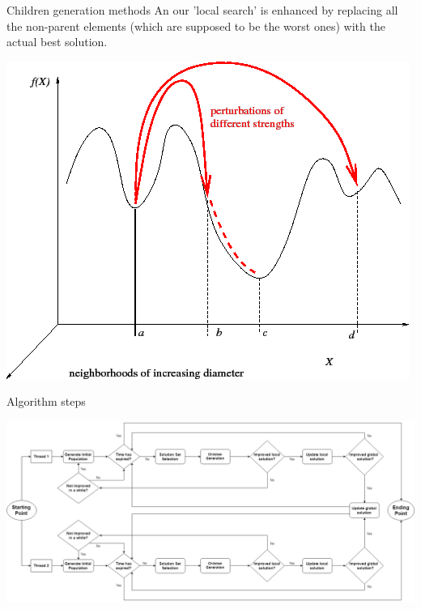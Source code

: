\documentclass[12pt]{beamer}
\begin{document}
  \begin{frame}[fragile]{Children generation methods}
    An our 'local search' is enhanced by replacing all the non-parent elements (which are supposed to be the worst ones) with the actual best solution.\\
    \begin{center}
      \includegraphics[scale=0.3]{res/LocalSearch}
    \end{center}
  \end{frame}

  \begin{frame}[fragile]{Algorithm steps}
    \begin{adjustwidth}{-2em}{-2em}
      \includegraphics[scale=0.21]{res/Algorithm}
    \end{adjustwidth}
  \end{frame}
\end{document}
